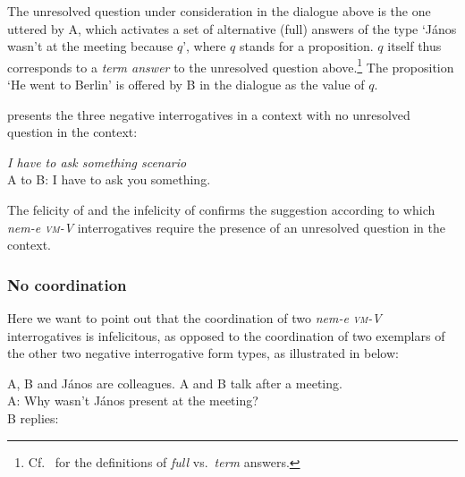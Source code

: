 \documentclass[output=paper,colorlinks,citecolor=brown]{langscibook}
\begin{document}
	
	\noindent The unresolved question under consideration  in the dialogue above is the one uttered by A, which activates a set of alternative (full) answers of the type `János wasn't at the meeting because $q$', where $q$ stands for a proposition. $q$ itself thus corresponds to a \textit{term answer} to the unresolved question above.\footnote{Cf.~\citet{krifka2011} for the definitions of \textit{full} vs.~\textit{term} answers.}
	The proposition `He went to Berlin' is offered by B in the dialogue as the  value of $q$.
	
	
	 presents  the three negative interrogatives in a context  with no unresolved question in the context:
	
	\ea\label{ex:passed} \textit{I have to ask something scenario}\\
	A to B:  I have to ask you something.
	\label{ex:passeda}
	\label{ex:passedb}
	\label{ex:passedc}
	\z
	\z
	
	\noindent The felicity of  and the infelicity of   confirms the suggestion according to which \textit{nem-e \textsc{vm}-V} interrogatives require the presence of an unresolved question in the context.
	
	
\subsubsection{No coordination}\label{sect:complete}
	
	Here we want to point out that the coordination of two \textit{nem-e \textsc{vm}-V} interrogatives is infelicitous, as opposed to the coordination of two exemplars of the other two negative interrogative form types, as illustrated in  below:
	
	\ea\label{ex:sugg-var} A, B and János are colleagues. A and B talk after a meeting.\\
	A: Why wasn't János present at the meeting?\\
	B replies:
	\label{ex:sugga}
	\label{ex:suggb}
	\label{ex:suggc}
	\z
	\z
	
\end{document}
